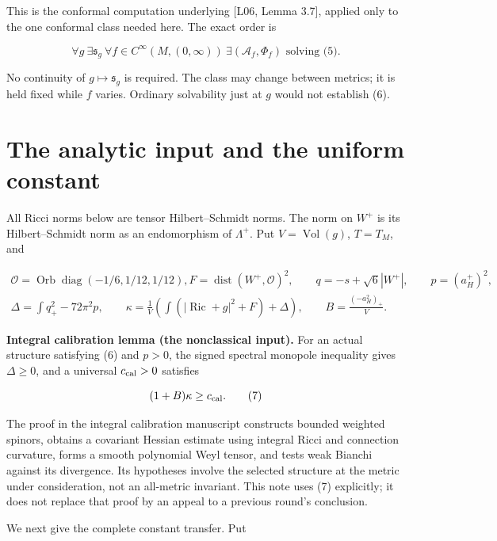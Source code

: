 \documentclass[
  11pt,
]{article}
\begin{document}
This is the conformal computation underlying {[}L06, Lemma 3.7{]},
applied only to the one conformal class needed here. The exact order is

\[
\forall g\ \exists\mathfrak s_g\ \forall f\in C^\infty(M,(0,\infty))
\ \exists(\mathcal A_f,\Phi_f)\text{ solving (5)}.       \tag{6}
\]

No continuity of \(g\mapsto\mathfrak s_g\) is required. The class may
change between metrics; it is held fixed while \(f\) varies. Ordinary
solvability just at \(g\) would not establish (6).

\hypertarget{the-analytic-input-and-the-uniform-constant}{%
\section{The analytic input and the uniform
constant}\label{the-analytic-input-and-the-uniform-constant}}

All Ricci norms below are tensor Hilbert--Schmidt norms. The norm on
\(W^+\) is its Hilbert--Schmidt norm as an endomorphism of
\(\Lambda^+\). Put \(V=\operatorname{Vol}(g)\), \(T=T_M\), and

\[
\begin{gathered}
\mathscr O=\operatorname{Orb}\operatorname{diag}(-1/6,1/12,1/12),
F=\operatorname{dist}(W^+,\mathscr O)^2,\qquad
q=-s+\sqrt6|W^+|,\qquad p=(a_H^+)^2,\\
\Delta=\int q_+^2-72\pi^2p,\qquad
\kappa=\frac1V\left(\int(|\operatorname{Ric}+g|^2+F)+\Delta\right),
\qquad B=\frac{(-a_H^2)_+}{V}.
\end{gathered}
\]

\textbf{Integral calibration lemma (the nonclassical input).} For an
actual structure satisfying (6) and \(p>0\), the signed spectral
monopole inequality gives \(\Delta\ge0\), and a universal
\(c_{\rm cal}>0\) satisfies

\[
                    (1+B)\kappa\ge c_{\rm cal}.         \tag{7}
\]

The proof in the integral calibration manuscript constructs bounded
weighted spinors, obtains a covariant Hessian estimate using integral
Ricci and connection curvature, forms a smooth polynomial Weyl tensor,
and tests weak Bianchi against its divergence. Its hypotheses involve
the selected structure at the metric under consideration, not an
all-metric invariant. This note uses (7) explicitly; it does not replace
that proof by an appeal to a previous round's conclusion.

We next give the complete constant transfer. Put
\end{document}
